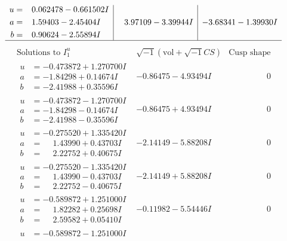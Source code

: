 \documentclass[1p]{elsarticle_modified}
\theoremstyle{definition}
\newcommand{\I}{\sqrt{-1}}
\begin{document}
$$\begin{array}{c|c|c}
\begin{aligned}
u &= \phantom{-}0.062478 - 0.661502 I \\
a &= \phantom{-}1.59403 - 2.45404 I \\
b &= \phantom{-}0.90624 - 2.55894 I\end{aligned}
 & \phantom{-}3.97109 - 3.39944 I & -3.68341 - 1.39930 I\\
 \hline 
 \end{array}$$\newpage$$\begin{array}{c|c|c}  
\text{Solutions to }I^u_{1}& \I (\text{vol} + \sqrt{-1}CS) & \text{Cusp shape}\\
 \hline 
\begin{aligned}
u &= -0.473872 + 1.270700 I \\
a &= -1.84298 + 0.14674 I \\
b &= -2.41988 + 0.35596 I\end{aligned}
 & -0.86475 - 4.93494 I & \phantom{-0.000000 } 0 \\ \hline\begin{aligned}
u &= -0.473872 - 1.270700 I \\
a &= -1.84298 - 0.14674 I \\
b &= -2.41988 - 0.35596 I\end{aligned}
 & -0.86475 + 4.93494 I & \phantom{-0.000000 } 0 \\ \hline\begin{aligned}
u &= -0.275520 + 1.335420 I \\
a &= \phantom{-}1.43990 + 0.43703 I \\
b &= \phantom{-}2.22752 + 0.40675 I\end{aligned}
 & -2.14149 - 5.88208 I & \phantom{-0.000000 } 0 \\ \hline\begin{aligned}
u &= -0.275520 - 1.335420 I \\
a &= \phantom{-}1.43990 - 0.43703 I \\
b &= \phantom{-}2.22752 - 0.40675 I\end{aligned}
 & -2.14149 + 5.88208 I & \phantom{-0.000000 } 0 \\ \hline\begin{aligned}
u &= -0.589872 + 1.251000 I \\
a &= \phantom{-}1.82282 + 0.25698 I \\
b &= \phantom{-}2.59582 + 0.05410 I\end{aligned}
 & -0.11982 - 5.54446 I & \phantom{-0.000000 } 0 \\ \hline\begin{aligned}
u &= -0.589872 - 1.251000 I \\

\end{aligned}
\end{array}$$
\end{document}
